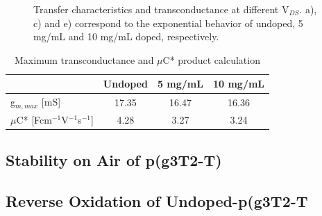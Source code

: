 \begin{figure}[ht]
    \qquad
    \caption{Transfer characteristics and transconductance at different V$_{DS}$. a), c) and e) correspond to the exponential behavior of undoped, 5 mg/mL and 10 mg/mL doped, respectively.}
    \label{fig:transfercurves}
\end{figure}

\begin{table}[ht]
\centering
\caption{Maximum transconductance and $\mu$C* product calculation}
\begin{tabular}{l|c|c|c}
& Undoped & 5 mg/mL & 10 mg/mL \\\hline
g$_{m,max}$ [mS] & 17.35 & 16.47 & 16.36\\
$\mu$C* [Fcm$^{-1}$V$^{-1}$s$^{-1}$] & 4.28 & 3.27 & 3.24\\\hline
\end{tabular}
\label{tab:fom}
\end{table}


\subsection{Stability on Air of p(g3T2-T)}

\subsection{Reverse Oxidation of Undoped-p(g3T2-T}

